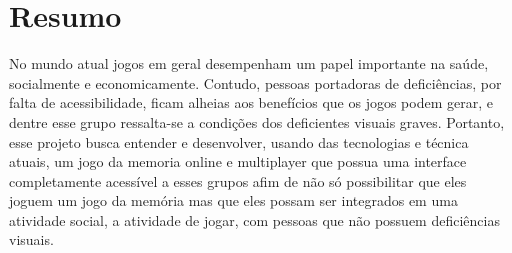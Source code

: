 \chapter{Resumo}

\label{chap:Resumo}

No mundo atual jogos em geral desempenham um papel importante na saúde, socialmente e economicamente. Contudo, pessoas portadoras de deficiências, por falta de acessibilidade, ficam alheias aos benefícios que os jogos podem gerar, e dentre esse grupo ressalta-se a condições dos deficientes visuais graves. Portanto, esse projeto busca entender e desenvolver, usando das tecnologias e técnica atuais, um jogo da memoria online e multiplayer que possua uma interface completamente acessível a esses grupos afim de não só possibilitar que eles joguem um jogo da memória mas que eles possam ser integrados em uma atividade social, a atividade de jogar, com pessoas que não possuem deficiências visuais.

